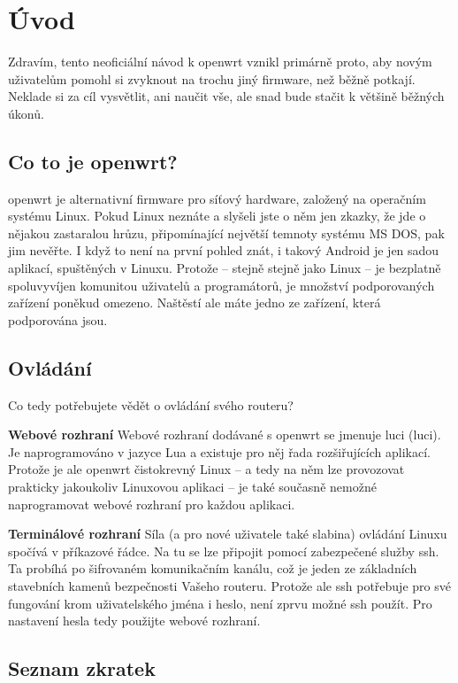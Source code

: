 \section*{Úvod}
Zdravím, tento neoficiální návod k \gls{openwrt} vznikl primárně proto,
aby novým uživatelům pomohl si zvyknout na trochu jiný firmware, než běžně
potkají. Neklade si za cíl vysvětlit, ani naučit vše, ale snad bude
stačit k většině běžných úkonů.

\subsection*{Co to je \gls{openwrt}?}
\gls{openwrt} je alternativní firmware pro síťový hardware, založený na
operačním systému Linux. Pokud Linux neznáte a slyšeli jste o něm jen
zkazky, že jde o nějakou zastaralou hrůzu, připomínající největší temnoty
systému MS DOS, pak jim nevěřte. I když to není na první pohled znát, i
takový Android je jen sadou aplikací, spuštěných v Linuxu. Protože -- stejně
stejně jako Linux -- je bezplatně spoluvyvíjen komunitou uživatelů a programátorů,
je množství podporovaných zařízení poněkud omezeno. Naštěstí ale máte jedno
ze zařízení, která podporována jsou.

\subsection*{Ovládání}
Co tedy potřebujete vědět o ovládání svého routeru?
\begin{description}
\item{\textbf{Webové rozhraní}}
Webové rozhraní dodávané s \gls{openwrt} se jmenuje \acrshort{luci}
(\acrlong{luci}). Je naprogramováno v jazyce Lua a existuje pro něj řada
rozšiřujících aplikací. Protože je ale \gls{openwrt} čistokrevný Linux
-- a tedy na něm lze provozovat prakticky jakoukoliv Linuxovou aplikaci --
je také současně nemožné naprogramovat webové rozhraní pro každou aplikaci.
\item{\textbf{Terminálové rozhraní}}
Síla (a pro nové uživatele také slabina) ovládání Linuxu spočívá v příkazové
řádce. Na tu se lze připojit pomocí zabezpečené služby \gls{ssh}. Ta probíhá
po šifrovaném komunikačním kanálu, což je jeden ze základních stavebních
kamenů bezpečnosti Vašeho routeru. Protože ale ssh potřebuje pro své fungování
krom uživatelského jména i heslo, není zprvu možné ssh použít. Pro nastavení
hesla tedy použijte webové rozhraní.
\end{description}

\subsection*{Seznam zkratek}
\printglossaries
